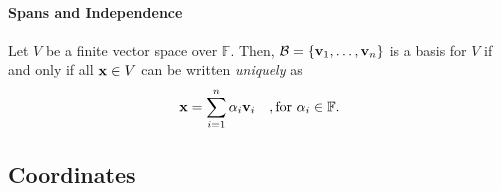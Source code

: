 \paragraph{Spans and Independence}
Let \(V\) be a finite vector space over \(\mathbb{F}\).
Then, \(\mathcal{B} = \{\mathbf{v}_1, \dots, \mathbf{v}_n\}\) is a basis for
\(V\) if and only if all \(\mathbf{x} \in V\)
can be written \textit{uniquely} as 
\[
    \mathbf{x} = \sum_{i=1}^{n} \alpha_i \mathbf{v}_i \quad, \text{for } \alpha_i \in \mathbb{F}.
\]

\subsection{Coordinates}

